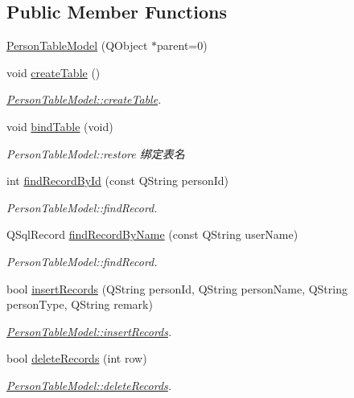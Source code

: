 \subsection*{Public Member Functions}
\begin{DoxyCompactItemize}
\item 
\mbox{\hyperlink{class_person_table_model_af1b578edb6207eeb621e50fa2d246fb6}{Person\+Table\+Model}} (Q\+Object $\ast$parent=0)
\item 
void \mbox{\hyperlink{class_person_table_model_a121018cb2905e38572a05c457e9fda35}{create\+Table}} ()
\begin{DoxyCompactList}\small\item\em \mbox{\hyperlink{class_person_table_model_a121018cb2905e38572a05c457e9fda35}{Person\+Table\+Model\+::create\+Table}}. \end{DoxyCompactList}\item 
void \mbox{\hyperlink{class_person_table_model_a4abbde77bb6256c11d464d59c77878e4}{bind\+Table}} (void)
\begin{DoxyCompactList}\small\item\em Person\+Table\+Model\+::restore 绑定表名 \end{DoxyCompactList}\item 
int \mbox{\hyperlink{class_person_table_model_afd1547d0c85e360bad55b08aa0f4e338}{find\+Record\+By\+Id}} (const Q\+String person\+Id)
\begin{DoxyCompactList}\small\item\em Person\+Table\+Model\+::find\+Record. \end{DoxyCompactList}\item 
Q\+Sql\+Record \mbox{\hyperlink{class_person_table_model_aead4c2d3f11bb6b137fefbb5a88ff777}{find\+Record\+By\+Name}} (const Q\+String user\+Name)
\begin{DoxyCompactList}\small\item\em Person\+Table\+Model\+::find\+Record. \end{DoxyCompactList}\item 
bool \mbox{\hyperlink{class_person_table_model_a4cac1b30aecba8739333cbcfb8d66515}{insert\+Records}} (Q\+String person\+Id, Q\+String person\+Name, Q\+String person\+Type, Q\+String remark)
\begin{DoxyCompactList}\small\item\em \mbox{\hyperlink{class_person_table_model_a4cac1b30aecba8739333cbcfb8d66515}{Person\+Table\+Model\+::insert\+Records}}. \end{DoxyCompactList}\item 
bool \mbox{\hyperlink{class_person_table_model_a23ae24fe86e68f54a2d3259c924e122c}{delete\+Records}} (int row)
\begin{DoxyCompactList}\small\item\em \mbox{\hyperlink{class_person_table_model_a23ae24fe86e68f54a2d3259c924e122c}{Person\+Table\+Model\+::delete\+Records}}. \end{DoxyCompactList}\end{DoxyCompactItemize}
